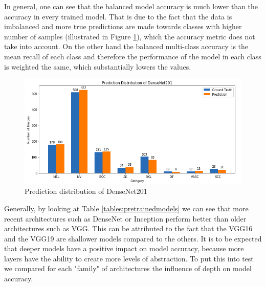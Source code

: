     In general, one can see that the balanced model accuracy is much lower than the accuracy in every trained model. That is due to the fact that the data is imbalanced and more true predictions are made towards classes with higher number of samples (illustrated in Figure \ref{fig:densenet201_pred_dist}), which the accuracy metric does not take into account. On the other hand the balanced multi-class accuracy is the mean recall of each class and therefore the performance of the model in each class is weighted the same, which substantially lowers the values. \par
    \begin{figure}[ht]
        \centering
        \includegraphics[width=\textwidth]{figs/densenet201_pred_dist.png}
        \caption{Prediction distribution of DenseNet201}
        \label{fig:densenet201_pred_dist}
    \end{figure}
    
    Generally, by looking at Table \ref{tables:pretrainedmodels} we can see that more recent architectures such as DenseNet or Inception perform better than older architectures such as VGG. This can be attributed to the fact that the VGG16 and the VGG19 are shallower models compared to the others. It is to be expected that deeper models have a positive impact on model accuracy, because more layers have the ability to create more levels of abstraction. To put this into test we compared for each "family" of architectures the influence of depth on model accuracy. \par 
    
